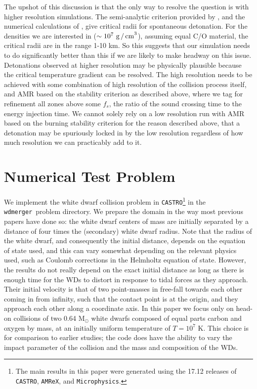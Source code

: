 \documentclass[twocolumn,numberedappendix]{../aastex62}
\newcommand{\msolar}{\mathrm{M}_\odot}
\newcommand{\amrex}{\texttt{AMReX}}
\newcommand{\castro}{\texttt{CASTRO}}
\newcommand{\microphysics}{\texttt{Microphysics}}
\newcommand{\wdmerger}{\texttt{wdmerger}}
\begin{document}
The upshot of this discussion is that the only way to resolve the
question is with higher resolution simulations. The semi-analytic
criterion provided by \cite{garg:2017}, and the numerical calculations
of \cite{seitenzahl:2009}, give critical radii for spontaneous detonation.
For the densities we are interested in ($\sim 10^7\ \text{g\,/\,cm}^3$),
assuming equal C/O material, the critical radii are in the range 1-10 km.
So this suggests that our simulation needs to do significantly better than
this if we are likely to make headway on this issue. Detonations observed
at higher resolution may be physically plausible because the critical
temperature gradient can be resolved. The high resolution needs to be
achieved with some combination of high resolution of the collision process
itself, and AMR based on the stability criterion as described
above, where we tag for refinement all zones above some $f_{s}$, the
ratio of the sound crossing time to the energy injection time. We
cannot solely rely on a low resolution run with AMR based on the
burning stability criterion for the reason described above, that a
detonation may be spuriously locked in by the low resolution regardless
of how much resolution we can practicably add to it.



\section{Numerical Test Problem}
\label{sec:collisions}

We implement the white dwarf collision problem in \castro\footnote{The main results
in this paper were generated using the 17.12 releases of \castro, \amrex, and
\microphysics.} in the \wdmerger\ problem
directory. We prepare the domain in the way most previous papers have done so:
the white dwarf centers of mass are initially separated by a distance of four times
the (secondary) white dwarf radius. Note that the radius of the white dwarf, and
consequently the initial distance, depends on the equation of state used, and this
can vary somewhat depending on the relevant physics used, such as Coulomb corrections
in the Helmholtz equation of state. However, the results do not really depend on the
exact initial distance as long as there is enough time for the WDs to distort in
response to tidal forces as they approach. Their initial velocity is that of
two point-masses in free-fall towards each other coming in from infinity, such that
the contact point is at the origin, and they approach each other along a coordinate axis.
In this paper we focus only on head-on collisions of two 0.64 $\msolar$ white dwarfs
composed of equal parts carbon and oxygen by mass, at an initially uniform temperature
of $T = 10^7$ K. This choice is for comparison to earlier studies; the code does have
the ability to vary the impact parameter of the collision and the mass and composition
of the WDs.
\end{document}
